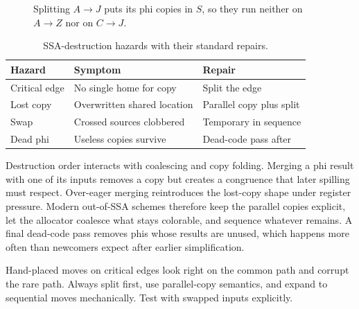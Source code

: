 \begin{figure}[htbp]
\centering
{}
\caption{Splitting $A\to J$ puts its phi copies in $S$, so they run neither on $A\to Z$ nor on $C\to J$.}
\label{fig:ch28-critical}
\end{figure}

\begin{table}[htbp]
\caption{SSA-destruction hazards with their standard repairs.}
\label{tab:ch28-destruction-fixes}
\begin{tabular}{lll}
\toprule
Hazard & Symptom & Repair \\
\midrule
Critical edge & No single home for copy & Split the edge \\
Lost copy & Overwritten shared location & Parallel copy plus split \\
Swap & Crossed sources clobbered & Temporary in sequence \\
Dead phi & Useless copies survive & Dead-code pass after \\
\bottomrule
\end{tabular}
\end{table}

Destruction order interacts with coalescing and copy folding.
Merging a phi result with one of its inputs removes a copy but creates a congruence that later spilling must respect.
Over-eager merging reintroduces the lost-copy shape under register pressure.
Modern out-of-SSA schemes therefore keep the parallel copies explicit, let the allocator coalesce what stays colorable, and sequence whatever remains.
A final dead-code pass removes phis whose results are unused, which happens more often than newcomers expect after earlier simplification.
\begin{ccwarning}
Hand-placed moves on critical edges look right on the common path and corrupt the rare path.
Always split first, use parallel-copy semantics, and expand to sequential moves mechanically.
Test with swapped inputs explicitly.
\end{ccwarning}

